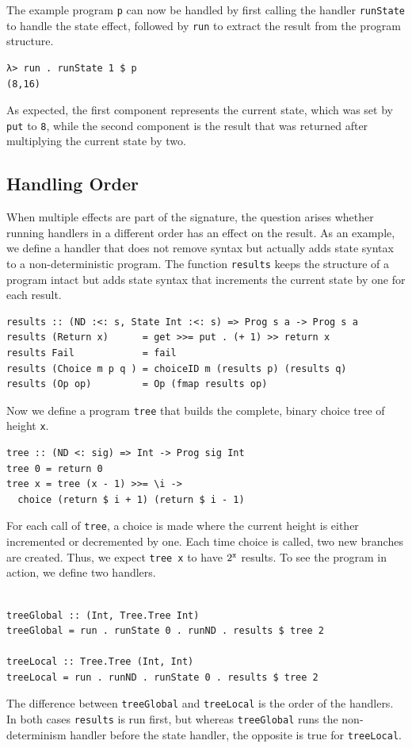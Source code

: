 \documentclass[a4paper, 11pt, fleqn, twoside, abstract=on]{scrreprt}
\newcommand{\hinl}[1]{\texttt{#1}}
\begin{document}
The example program \hinl{p} can now be handled by first calling the handler \hinl{runState} to handle the state effect, followed by \hinl{run} to extract the result from the program structure.

\begin{verbatim}
λ> run . runState 1 $ p
(8,16)
\end{verbatim}
\noindent
As expected, the first component represents the current state, which was set by \hinl{put} to \hinl{8}, while the second component is the result that was returned after multiplying the current state by two.

\subsection{Handling Order}
When multiple effects are part of the signature, the question arises whether running handlers in a different order has an effect on the result.
As an example, we define a handler that does not remove syntax but actually adds state syntax to a non-deterministic program.
The function \hinl{results} keeps the structure of a program intact but adds state syntax that increments the current state by one for each result.

\begin{verbatim}
results :: (ND :<: s, State Int :<: s) => Prog s a -> Prog s a
results (Return x)      = get >>= put . (+ 1) >> return x
results Fail            = fail
results (Choice m p q ) = choiceID m (results p) (results q)
results (Op op)         = Op (fmap results op)
\end{verbatim}
\noindent
Now we define a program \hinl{tree} that builds the complete, binary choice tree of height \hinl{x}.

\begin{verbatim}
tree :: (ND <: sig) => Int -> Prog sig Int
tree 0 = return 0
tree x = tree (x - 1) >>= \i -> 
  choice (return $ i + 1) (return $ i - 1)
\end{verbatim}
\noindent
For each call of \hinl{tree}, a choice is made where the current height is either incremented or decremented by one.
Each time choice is called, two new branches are created.
Thus, we expect \hinl{tree x} to have $2^\text{\hinl{x}}$ results.
To see the program in action, we define two handlers.
\begin{verbatim}

treeGlobal :: (Int, Tree.Tree Int)
treeGlobal = run . runState 0 . runND . results $ tree 2

treeLocal :: Tree.Tree (Int, Int)
treeLocal = run . runND . runState 0 . results $ tree 2
\end{verbatim}
\noindent
The difference between \hinl{treeGlobal} and \hinl{treeLocal} is the order of the handlers.
In both cases \hinl{results} is run first, but whereas \hinl{treeGlobal} runs the non-determinism handler before the state handler, the opposite is true for \hinl{treeLocal}.
\end{document}
